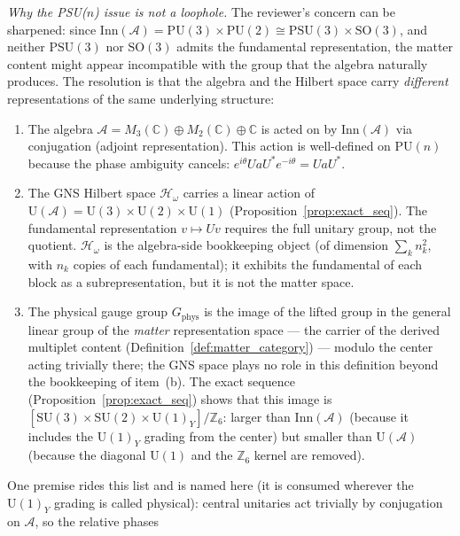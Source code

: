 \documentclass[11pt]{article}
\theoremstyle{definition}
\newcommand{\SU}{\mathrm{SU}}
\newcommand{\U}{\mathrm{U}}
\begin{document}
\noindent\textit{Why the PSU($n$) issue is not a loophole.}\quad
The reviewer's concern can be sharpened: since $\mathrm{Inn}(\mathcal{A})
= \mathrm{PU}(3) \times \mathrm{PU}(2) \cong \mathrm{PSU}(3) \times
\mathrm{SO}(3)$, and neither $\mathrm{PSU}(3)$ nor $\mathrm{SO}(3)$
admits the fundamental representation, the matter content might appear
incompatible with the group that the algebra naturally produces.  The
resolution is that the algebra and the Hilbert space carry
\emph{different} representations of the same underlying structure:
\begin{enumerate}[label=(\alph*),nosep]
  \item The algebra $\mathcal{A} = M_3(\mathbb{C}) \oplus
  M_2(\mathbb{C}) \oplus \mathbb{C}$ is acted on by
  $\mathrm{Inn}(\mathcal{A})$ via conjugation (adjoint
  representation).  This action is well-defined on
  $\mathrm{PU}(n)$ because the phase ambiguity cancels:
  $e^{i\theta} U a U^* e^{-i\theta} = UaU^*$.
  \item The GNS Hilbert space $\mathcal{H}_\omega$ carries a linear
  action of $\mathrm{U}(\mathcal{A}) = \mathrm{U}(3) \times
  \mathrm{U}(2) \times \mathrm{U}(1)$
  (Proposition~\ref{prop:exact_seq}).  The fundamental representation
  $v \mapsto Uv$ requires the full unitary group, not the quotient.
  $\mathcal{H}_\omega$ is the algebra-side bookkeeping object (of
  dimension $\sum_k n_k^2$, with $n_k$ copies of each fundamental); it
  exhibits the fundamental of each block as a subrepresentation, but
  it is not the matter space.
  \item The physical gauge group $G_{\mathrm{phys}}$ is the image of
  the lifted group in the general linear group of the \emph{matter}
  representation space --- the carrier of the derived multiplet
  content (Definition~\ref{def:matter_category}) --- modulo the center
  acting trivially there; the GNS space plays no role in this
  definition beyond the bookkeeping of item~(b).  The exact sequence
  (Proposition~\ref{prop:exact_seq}) shows that this image is
  $[\SU(3) \times \SU(2) \times \U(1)_Y] / \mathbb{Z}_6$:
  larger than $\mathrm{Inn}(\mathcal{A})$ (because it includes the
  $\U(1)_Y$ grading from the center) but smaller than
  $\mathrm{U}(\mathcal{A})$ (because the diagonal $\mathrm{U}(1)$
  and the $\mathbb{Z}_6$ kernel are removed).
\end{enumerate}
One premise rides this list and is named here (it is consumed
wherever the $\U(1)_Y$ grading is called physical): central unitaries
act trivially by conjugation on $\mathcal{A}$, so the relative phases
\end{document}
